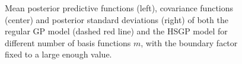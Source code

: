\documentclass[onecolumn,a4paper,11pt]{article}
\begin{document}
\begin{figure}
\caption{Mean posterior predictive functions (left), covariance functions (center) and posterior standard deviations (right) of both the regular GP model (dashed red line) and the HSGP model for different number of basis functions $m$, with the boundary factor fixed to a large enough value.}
  \label{fig1_Post_J}
\end{figure}
\end{document}
